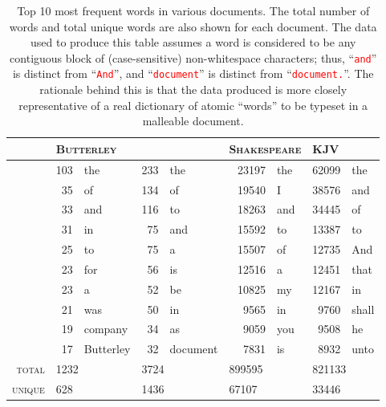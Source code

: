\begin{table} \footnotesize
    \myfloatalign
  \begin{tabularx}{\textwidth}{rrlrlrlrl} \toprule
    & \multicolumn{2}{l}{\textsc{Butterley}} & \multicolumn{2}{l}{\cite{Pinkney2011}} & \multicolumn{2}{l}{\textsc{Shakespeare}} & \multicolumn{2}{l}{\textsc{KJV}}\\
    \midrule
    & 103 & the & 233 & the & 23197 & the & 62099 & the \\ 
    & 35 & of & 134 & of & 19540 & I & 38576 & and \\ 
    & 33 & and & 116 & to & 18263 & and & 34445 & of \\ 
    & 31 & in & 75 & and & 15592 & to & 13387 & to \\ 
    & 25 & to & 75 & a & 15507 & of & 12735 & And \\ 
    & 23 & for & 56 & is & 12516 & a & 12451 & that \\ 
    & 23 & a & 52 & be & 10825 & my & 12167 & in \\ 
    & 21 & was & 50 & in & 9565 & in & 9760 & shall \\ 
    & 19 & company & 34 & as & 9059 & you & 9508 & he \\ 
    & 17 & Butterley & 32 & document & 7831 & is & 8932 & unto \\ 
    \midrule
    \textsc{total} & \multicolumn{2}{l}{1232} & \multicolumn{2}{l}{3724} & \multicolumn{2}{l}{899595} & \multicolumn{2}{l}{821133} \\ 
    \midrule
    \textsc{unique} & \multicolumn{2}{l}{628} & \multicolumn{2}{l}{1436} & \multicolumn{2}{l}{67107} & \multicolumn{2}{l}{33446} \\ 
    \bottomrule
    
  \end{tabularx}
  \caption[Word frequencies in various documents]{Top 10 most frequent words in various documents. The total number of words and total unique words are also shown for each document. The data used to produce this table assumes a word is considered to be any contiguous block of (case-sensitive) non-whitespace characters; thus, ``\texttt{\textcolor{red}{and}}'' is distinct from ``\texttt{\textcolor{red}{And}}'', and ``\texttt{\textcolor{red}{document}}'' is distinct from ``\texttt{\textcolor{red}{document.}}''. The rationale behind this is that the data produced is more closely representative of a real dictionary of atomic ``words'' to be typeset in a malleable document.}
  \label{tab:wordfreq}
\end{table}

